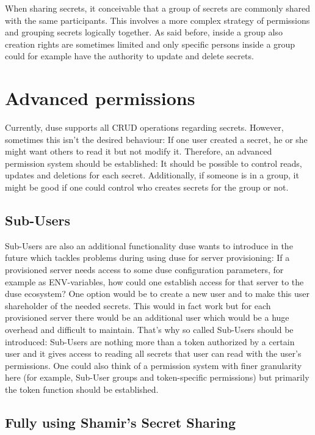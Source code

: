 When sharing secrets, it conceivable that a group of secrets are commonly
shared with the same participants. This involves a more complex strategy of
permissions and grouping secrets logically together. As said before,
inside a group also creation rights are sometimes limited and only specific
persons inside a group could for example have the authority to update and
delete secrets.

\section{Advanced permissions}

Currently, duse supports all CRUD operations regarding secrets. However,
sometimes this isn't the desired behaviour: If one user created a secret,
he or she might want others to read it but not modify it. Therefore, an
advanced permission system should be established: It should be possible to
control reads, updates and deletions for each secret. Additionally, if
someone is in a group, it might be good if one could control who creates
secrets for the group or not.

\subsection{Sub-Users}

Sub-Users are also an additional functionality duse wants to introduce in
the future which tackles problems during using duse for server provisioning:
If a provisioned server needs access to some duse configuration parameters,
for example as ENV-variables, how could one establish access for that server
to the duse ecosystem? One option would be to create a new user and to make
this user shareholder of the needed secrets. This would in fact work but for
each provisioned server there would be an additional user which would be a
huge overhead and difficult to maintain. That's why so called Sub-Users should
be introduced: Sub-Users are nothing more than a token authorized by a certain
user and it gives access to reading all secrets that user can read with the
user's permissions. One could also think of a permission system with finer
granularity here (for example, Sub-User groups and token-specific permissions)
but primarily the token function should be established.

\subsection{Fully using Shamir's Secret Sharing}

